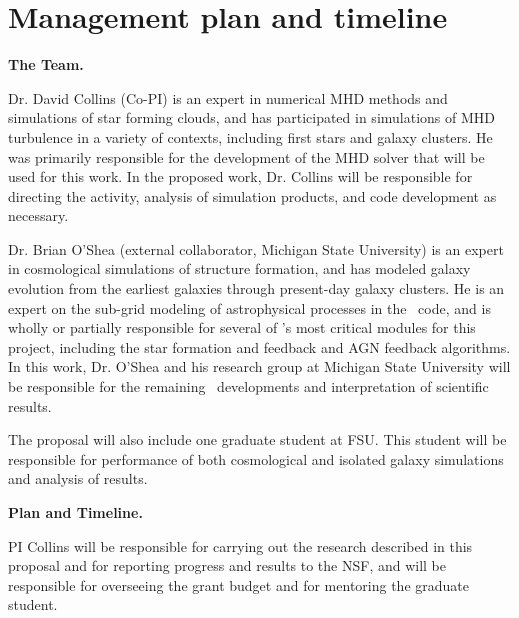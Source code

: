 \vspace{-4mm}
\section{Management plan and timeline}
\label{sec:timeline}
\vspace{-3mm}

\textbf{The Team.}  

Dr. David Collins (Co-PI) is an expert in numerical MHD methods and
simulations of star forming clouds, and has participated in
simulations of MHD turbulence in a variety of contexts, including
first stars and galaxy clusters.  He was primarily responsible for
the development of the MHD solver that will be used for this work.  In
the proposed work, Dr. Collins will be responsible for directing the activity,
analysis of simulation products, and code development as necessary.



Dr. Brian O'Shea (external collaborator, Michigan State University) is an expert in cosmological simulations of
structure formation, and has modeled galaxy evolution from the
earliest galaxies through present-day galaxy clusters.  He is an
expert on the sub-grid modeling of astrophysical processes in the
\enzo\ code, and is wholly or partially responsible for several of
\enzo's most critical modules for this project, including the star
formation and feedback and AGN feedback algorithms.  In this work,
Dr. O'Shea and his research group at Michigan State University will be
responsible for the remaining \enzoe\ developments and interpretation of scientific results.

The proposal will also include one graduate student at FSU.  This student will
be responsible for performance of both cosmological and isolated galaxy
simulations and analysis of results.

\vspace{2mm}
\noindent
\textbf{Plan and Timeline.}

PI Collins will be responsible for
carrying out the research described in this proposal and for reporting
progress and results to the NSF, and will be responsible
for overseeing the grant budget and for mentoring the graduate student.

